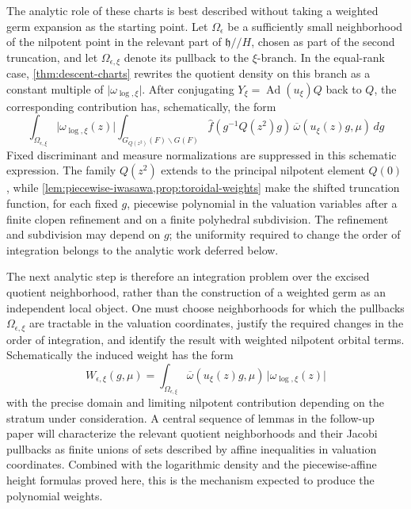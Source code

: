 \documentclass[11pt]{amsart}
\theoremstyle{definition}
\theoremstyle{remark}
\newcommand{\Ad}{\operatorname{Ad}}
\newcommand{\abs}[1]{\lvert #1\rvert}
\newcommand{\h}{\mathfrak h}
\begin{document}
The analytic role of these charts is best described without taking a weighted
germ expansion as the starting point.  Let $\Omega_\epsilon$ be a sufficiently small neighborhood of
the nilpotent point in the relevant part of $\h/\!/H$, chosen as part of the
second truncation, and let $\Omega_{\epsilon,\xi}$ denote its pullback to the
$\xi$-branch.  In the equal-rank case, \cref{thm:descent-charts} rewrites the
quotient density on this branch as a constant multiple of
$\abs{\omega_{\log,\xi}}$.  After conjugating
$Y_\xi=\Ad(u_\xi)Q$ back to $Q$, the corresponding contribution has,
schematically, the form
\begin{equation}\label{eq:induced-weight-schematic}
 \int_{\Omega_{\epsilon,\xi}}
   \abs{\omega_{\log,\xi}(z)}
   \int_{G_{Q(z^2)}(F)\backslash G(F)}
      \widehat f(g^{-1}Q(z^2)g)\,
      \overline\omega(u_\xi(z)g,\mu)\,dg 
\end{equation}
Fixed discriminant and measure normalizations are suppressed in this
schematic expression.  The family $Q(z^2)$ extends to the principal nilpotent
element $Q(0)$, while \cref{lem:piecewise-iwasawa,prop:toroidal-weights}
make the shifted truncation function, for each fixed $g$, piecewise polynomial
in the valuation variables after a finite clopen refinement and on a finite
polyhedral subdivision.  The refinement and subdivision may depend on $g$;
the uniformity required to change the order of integration belongs to the
analytic work deferred below.

The next analytic step is therefore an integration problem over the excised
quotient neighborhood, rather than the construction of a weighted germ as an
independent local object.  One must choose neighborhoods for which the
pullbacks $\Omega_{\epsilon,\xi}$ are tractable in the valuation coordinates,
justify the required changes in the order of integration, and identify the
result with weighted nilpotent orbital terms.  Schematically the induced
weight has the form
\[
 W_{\epsilon,\xi}(g,\mu)
 =\int_{\Omega_{\epsilon,\xi}}
    \overline\omega(u_\xi(z)g,\mu)\,
    \abs{\omega_{\log,\xi}(z)}
\]
with the precise domain and limiting nilpotent contribution depending on the
stratum under consideration.  A central sequence of lemmas in the follow-up paper
will characterize the relevant quotient neighborhoods and their Jacobi
pullbacks as finite unions of sets described by affine inequalities in
valuation coordinates.  Combined with the logarithmic density and the
piecewise-affine height formulas proved here, this is the mechanism expected
to produce the polynomial weights.
\end{document}
